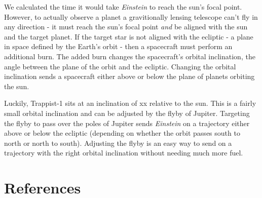 \documentclass[12pt]{article} %
\begin{document}
We calculated the time it would take \textit{Einstein} to reach the sun's focal point. However, to actually observe a planet a gravitionally lensing telescope can't fly in any direction - it must reach the sun's focal point \textit{and} be aligned with the sun and the target planet. If the target star is not aligned with the ecliptic - a plane in space defined by the Earth's orbit - then a spacecraft must perform an additional burn. The added burn changes the spacecraft's orbital inclination, the angle between the plane of the orbit and the ecliptic. Changing the orbital inclination sends a spacecraft either above or below the plane of planets orbiting the sun.

Luckily, Trappist-1 sits at an inclination of xx relative to the sun. This is a fairly small orbital inclination and can be adjusted by the flyby of Jupiter. Targeting the flyby to pass over the poles of Jupiter sends \textit{Einstein} on a trajectory either above or below the ecliptic (depending on whether the orbit passes south to north or north to south). Adjusting the flyby is an easy way to send  on a trajectory with the right orbital inclination without needing much more fuel.

\section{References}
\end{document}
